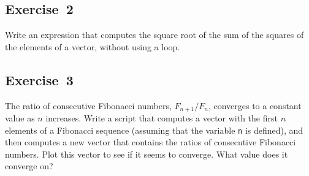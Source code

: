 \subsection{Exercise~2}
Write an expression that computes the square root of the sum of the squares of the elements of a vector, without using a loop.



\subsection{Exercise~3}
\label{fibratio}

The ratio of consecutive Fibonacci numbers, $F_{n+1}/F_{n}$, converges
to a constant value as $n$ increases.  Write a script that computes
a vector with the first $n$ elements of a Fibonacci sequence (assuming
that the variable \lstinline{n} is defined), and then computes a new
vector that contains the ratios of consecutive Fibonacci numbers.
Plot this vector to see if it seems to converge.  What value does
it converge on?




